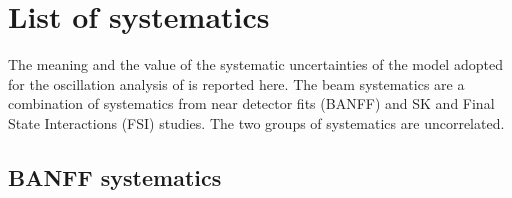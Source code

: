 \clearpage
\chapter{List of systematics}
\label{cha:systematics}

The meaning and the value of the systematic uncertainties of the model adopted for %
the oscillation analysis of  is reported here.
The beam systematics are a combination of systematics from near detector fits (BANFF) %
and SK and Final State Interactions (FSI) studies.
The two groups of systematics are uncorrelated.

\section{BANFF systematics}

